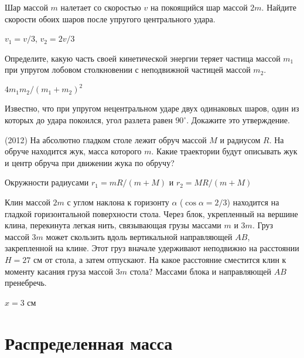 \begin{ex}
Шар массой $m$ налетает со скоростью $v$ на покоящийся шар массой $2m$. Найдите скорости обоих шаров после упругого центрального удара. 
\begin{ans}
$v_1 = v/3$, $v_2 = 2v/3$
\end{ans}
\end{ex}

\begin{ex}
Определите, какую часть своей кинетической энергии теряет частица массой $m_1$ при упругом лобовом столкновении 
с неподвижной частицей массой $m_2$. 
\begin{ans}
$4m_1m_2/(m_1+m_2)^2$
\end{ans}
\end{ex}

\begin{ex}
Известно, что при упругом нецентральном ударе двух одинаковых шаров, один из которых до удара покоился, угол разлета равен $90^{\circ}$. Докажите это утверждение.
\end{ex}

\begin{ex}
(2012) На абсолютно гладком столе лежит обруч массой $M$ и радиусом $R$. На обруче находится жук, масса которого $m$. Какие траектории будут описывать жук и центр обруча при движении жука по обручу?
\begin{ans}
Окружности радиусами $r_1 = mR/(m+M)$ и $r_2 = MR/(m+M)$
\end{ans}
\end{ex}

\begin{ex}
Клин массой $2m$ с углом наклона к горизонту $\alpha $ ($\cos \alpha = 2/3$) находится на гладкой горизонтальной поверхности стола. Через блок, укрепленный на вершине клина, перекинута легкая нить, связывающая грузы массами $m$ и $3m$. Груз массой $3m$ может скользить вдоль вертикальной направляющей $AB$, закрепленной на клине. Этот груз вначале удерживают неподвижно на расстоянии $H = 27$ см от стола, а затем отпускают. На какое расстояние сместится клин к моменту касания груза массой $3m$ стола? Массами блока и направляющей $AB$ пренебречь.
\begin{center}

\end{center}
\begin{ans}
$x = 3$ см
\end{ans}
\end{ex}

\section{Распределенная масса}

